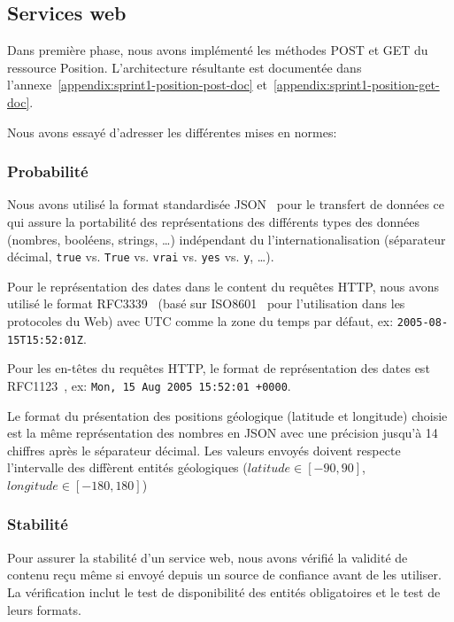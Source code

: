 \subsection{Services web}

Dans première phase, nous avons implémenté les méthodes POST et GET du ressource
Position. L'architecture résultante est documentée dans
l'annexe~\ref{appendix:sprint1-position-post-doc}
et~\ref{appendix:sprint1-position-get-doc}.

Nous avons essayé d'adresser les différentes mises en normes:

\subsubsection{Probabilité}

Nous avons utilisé la format standardisée JSON~\cite{ECMA-404} pour le transfert de
données ce qui assure la portabilité des représentations des différents types
des données (nombres, booléens, strings, \ldots) indépendant du
l'internationalisation (séparateur décimal, \verb|true| vs. \verb|True| vs.
\verb|vrai| vs. \verb|yes| vs. \verb|y|, \ldots).

Pour le représentation des dates dans le content du requêtes HTTP, nous avons utilisé
le format RFC3339~\cite{RFC3339} (basé sur ISO8601~\cite{ISO8601} pour
l'utilisation dans les protocoles du Web) avec UTC comme la zone du
temps par défaut, ex: \verb|2005-08-15T15:52:01Z|.

Pour les en-têtes du requêtes HTTP, le format de représentation des dates est
RFC1123~\cite{RFC1123}, ex: \verb|Mon, 15 Aug 2005 15:52:01 +0000|.

Le format du présentation des positions géologique (latitude et longitude)
choisie est la même représentation des nombres en JSON avec une précision
jusqu'à 14 chiffres après le séparateur décimal. Les valeurs envoyés doivent
respecte l'intervalle des diffèrent entités géologiques ($latitude \in [-90,
90]$, $longitude \in [-180, 180]$)

\subsubsection{Stabilité}

Pour assurer la stabilité d'un service web, nous avons vérifié la validité de
contenu reçu même si envoyé depuis un source de confiance avant de les
utiliser. La vérification inclut le test de disponibilité des entités
obligatoires et le test de leurs formats.

